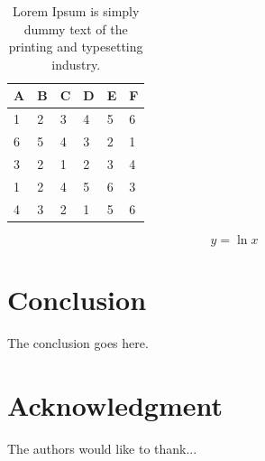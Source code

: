 \documentclass[conference]{IEEEtran}
\begin{document}
\begin{table}[tbp]
	\centering
	\caption{Lorem Ipsum is simply dummy text of the printing and typesetting industry.}
	\label{tab: table-1}
	\begin{tabular}{p{1cm}p{1cm}p{1cm}p{1cm}p{1cm}p{1cm}}
		\hline 
		A & B &  C &  D & E & F \\ 
		\hline 
		1 & 2 & 3 & 4 & 5 & 6 \\ 	
		6 & 5 & 4 & 3 & 2 & 1 \\ 
		3 & 2 & 1 & 2 & 3 & 4 \\ 
		1 & 2 & 4 & 5 & 6 & 3 \\ 
		4 & 3 & 2 & 1 & 5 & 6 \\ 
		\hline 
	\end{tabular} 	
\end{table}  

\begin{equation}
y = \ln x
\end{equation}  

\section{Conclusion}
The conclusion goes here.

\section*{Acknowledgment}
The authors would like to thank...



\end{document}

